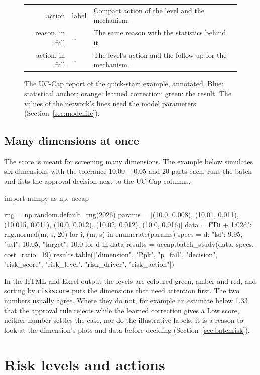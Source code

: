 \documentclass[a4paper,11pt,oneside,openany,parskip=half-,headings=standardclasses,toc=flat,numbers=noenddot]{scrbook}
\newcommand{\code}[1]{\texttt{\begingroup\def\_{\textunderscore\allowbreak}#1\endgroup}}
\newcommand{\secref}[1]{Section~\ref{#1}}
\begin{document}
\begin{figure}[!htp]
\begin{tabularx}{\textwidth}{@{}>{\ttfamily\footnotesize}r>{\ttfamily\footnotesize}lL@{}}
action & label & Compact action of the level and the mechanism.\\
reason, in full & \ldots & The same reason with the statistics behind it.\\
action, in full & \ldots & The level's action \cite[Eq.~(26)]{jy-hybrid} and the follow-up for the mechanism.\\
\bottomrule
\end{tabularx}
\caption{The UC-Cap report of the quick-start example, annotated. Blue: statistical anchor; orange: learned
correction; green: the result. The values of the network's lines need the model parameters
(\secref{sec:modelfile}).}\label{fig:hybridout}
\end{figure}

\subsection*{Many dimensions at once}

The score is meant for screening many dimensions. The example below simulates six dimensions with the tolerance
$10.00 \pm 0.05$ and 20 parts each, runs the batch and lists the approval decision next to the UC-Cap columns.

\begin{pycode}
import numpy as np, uccap

rng = np.random.default_rng(2026)
params = [(10.0, 0.008), (10.01, 0.011), (10.015, 0.011), (10.0, 0.012), (10.02, 0.012), (10.0, 0.016)]
data = {f"D{i + 1:02d}": rng.normal(m, s, 20) for i, (m, s) in enumerate(params)}
specs = {d: {"lsl": 9.95, "usl": 10.05, "target": 10.0} for d in data}
results = uccap.batch_study(data, specs, cost_ratio=19)
results.table(["dimension", "Ppk", "p_fail", "decision", "risk_score", "risk_level", "risk_driver", "risk_action"])
\end{pycode}

In the HTML and Excel output the levels are coloured green, amber and red, and sorting by \code{risk\_score} puts
the dimensions that need attention first. The two numbers usually agree. Where they do not, for example an
estimate below 1.33 that the approval rule rejects while the learned correction gives a Low score, neither number
settles the case, nor do the illustrative labels; it is a reason to look at the dimension's plots and data before
deciding (\secref{sec:batchrisk}).


\section{Risk levels and actions}
\end{document}
